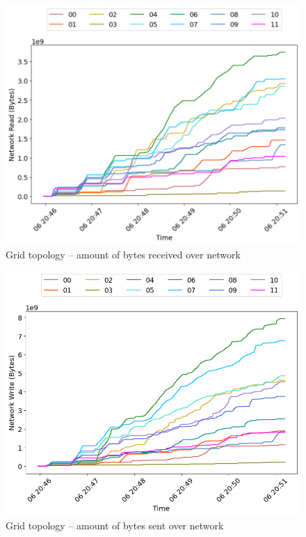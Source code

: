 \begin{minipage}{0.5\linewidth}
\begin{figure}[H]
\captionsetup{justification=centering,width=0.8\linewidth}
\includegraphics[width=\linewidth]{figures/grid/net_read.png}
\caption{Grid topology -- amount of bytes received over network}
\label{fig:grid-cpu_usage}
\end{figure}
\end{minipage}
\begin{minipage}{0.5\linewidth}
\begin{figure}[H]
\captionsetup{justification=centering,width=0.8\linewidth}
\includegraphics[width=\linewidth]{figures/grid/net_write.png}
\caption{Grid topology -- amount of bytes sent over network}
\label{fig:grid-mem_usage}
\end{figure}
\end{minipage}


